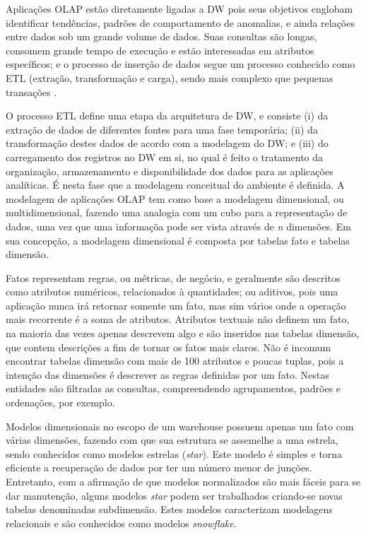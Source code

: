 \documentclass[12pt]{article}
\begin{document}
Aplicações OLAP estão diretamente ligadas a DW pois seus objetivos englobam identificar tendências, 
padrões de comportamento de anomalias, e ainda relações entre dados \cite{codd1998providing} sob um grande 
volume de dados. Suas consultas são longas, consomem grande tempo de execução e estão interessadas em 
atributos específicos; e o processo de inserção de dados segue um processo conhecido como ETL (extração, transformação e carga), 
sendo mais complexo que pequenas transações \cite{vertabelo2017olap}.

O processo ETL define uma etapa da arquitetura de DW, 
e consiste (i) da extração de dados de diferentes fontes para uma fase temporária; (ii) da transformação destes dados de acordo com a 
modelagem do DW; e (iii) do carregamento dos registros no DW em si, no qual é feito o tratamento da organização, armazenamento e 
disponibilidade dos dados para as aplicações analíticas. É nesta fase que a modelagem conceitual do ambiente é definida. 
A modelagem de aplicações OLAP tem como base a modelagem dimensional, ou multidimensional, fazendo uma analogia com um cubo para 
a representação de dados, uma vez que uma informaçõa pode ser vista através de \textit{n} dimensões. 
Em sua concepção, a modelagem dimensional é composta por tabelas fato e tabelas dimensão.

Fatos representam regras, ou métricas, de negócio, e geralmente são descritos como atributos 
numéricos, relacionados à quantidades; ou aditivos, pois uma aplicação nunca irá retornar somente um fato, 
mas sim vários onde a operação mais recorrente é a soma de atributos.
Atributos textuais não definem um fato, na maioria das vezes apenas descrevem algo e são inseridos 
nas tabelas dimensão, que contem descrições a fim de tornar os fatos mais claros. Não é incomum encontrar tabelas dimensão  
com mais de 100 atributos e poucas tuplas, pois a intenção das dimensões é descrever as regras definidas por um 
fato. Nestas entidades são filtradas as consultas, compreendendo agrupamentos, padrões e ordenações, por exemplo.

Modelos dimensionais no escopo de um warehouse possuem apenas um fato com várias dimensões, fazendo com que 
sua estrutura se assemelhe a uma estrela, sendo conhecidos como modelos estrelas (\textit{star}). Este modelo é 
simples e torna eficiente a recuperação de dados por ter um número menor de junções. Entretanto, com a afirmação de 
que modelos normalizados são mais fáceis para se dar manutenção, alguns modelos \textit{star} podem ser trabalhados 
criando-se novas tabelas denominadas subdimensão. Estes modelos caracterizam modelagens relacionais e são conhecidos 
como modelos \textit{snowflake}.
\end{document}
